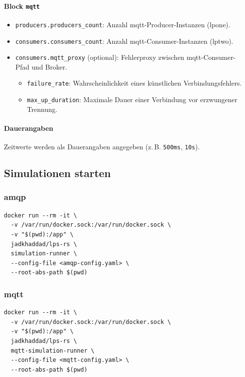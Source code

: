 \paragraph{Block \texttt{mqtt}}
\begin{itemize}
    \item \texttt{producers.producers\_count}: Anzahl \gls{mqtt}-Producer-Instanzen (\gls{lpone}).
    \item \texttt{consumers.consumers\_count}: Anzahl \gls{mqtt}-Consumer-Instanzen (\gls{lptwo}).
    \item \texttt{consumers.mqtt\_proxy} (optional): Fehlerproxy zwischen \gls{mqtt}-Consumer-Pfad und Broker.
          \begin{itemize}
              \item \texttt{failure\_rate}: Wahrscheinlichkeit eines künstlichen Verbindungsfehlers.
              \item \texttt{max\_up\_duration}: Maximale Dauer einer Verbindung vor erzwungener Trennung.
          \end{itemize}
\end{itemize}

\paragraph{Dauerangaben}
Zeitwerte werden als Dauerangaben angegeben (z.\,B. \texttt{500ms}, \texttt{10s}).

\subsection{Simulationen starten}

\subsubsection*{\gls{amqp}}

\begin{verbatim}
docker run --rm -it \
  -v /var/run/docker.sock:/var/run/docker.sock \
  -v "$(pwd):/app" \
  jadkhaddad/lps-rs \
  simulation-runner \
  --config-file <amqp-config.yaml> \
  --root-abs-path $(pwd)
\end{verbatim}

\subsubsection*{\gls{mqtt}}

\begin{verbatim}
docker run --rm -it \
  -v /var/run/docker.sock:/var/run/docker.sock \
  -v "$(pwd):/app" \
  jadkhaddad/lps-rs \
  mqtt-simulation-runner \
  --config-file <mqtt-config.yaml> \
  --root-abs-path $(pwd)
\end{verbatim}

